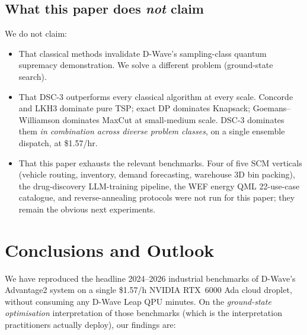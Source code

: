 \documentclass[11pt,a4paper]{article}
\begin{document}
\subsection{What this paper does \emph{not} claim}

We do not claim:
\begin{itemize}\itemsep0.15em
\item[$\bullet$] That classical methods invalidate D-Wave's
  sampling-class quantum supremacy demonstration. We solve a different
  problem (ground-state search).
\item[$\bullet$] That DSC-3 outperforms every classical algorithm at
  every scale. Concorde and LKH3 dominate pure TSP; exact DP dominates
  Knapsack; Goemans--Williamson dominates MaxCut at small-medium scale.
  DSC-3 dominates them \emph{in combination across diverse problem
  classes}, on a single ensemble dispatch, at \$1.57/hr.
\item[$\bullet$] That this paper exhausts the relevant benchmarks.
  Four of five SCM verticals (vehicle routing, inventory, demand
  forecasting, warehouse 3D bin packing), the drug-discovery
  LLM-training pipeline, the WEF energy QML 22-use-case catalogue,
  and reverse-annealing protocols were not run for this paper; they
  remain the obvious next experiments.
\end{itemize}

\section{Conclusions and Outlook}
\label{sec:conclusions}

We have reproduced the headline 2024--2026 industrial benchmarks of
D-Wave's Advantage2 system on a single \$1.57/h NVIDIA RTX~6000 Ada
cloud droplet, without consuming any D-Wave Leap QPU minutes. On the
\emph{ground-state optimisation} interpretation of those benchmarks
(which is the interpretation practitioners actually deploy), our
findings are:
\end{document}
